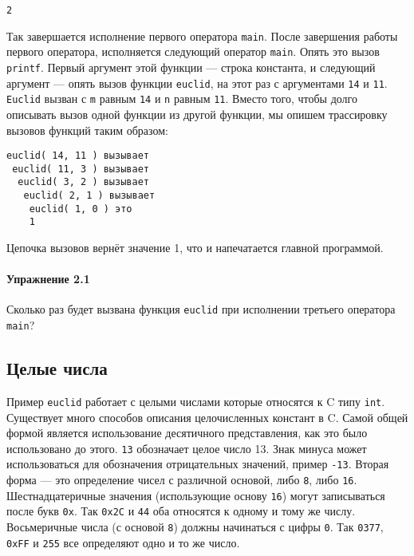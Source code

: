 \begin{lstlisting}
2
\end{lstlisting}

Так завершается исполнение первого оператора \lstinline|main|. После завершения работы первого оператора, исполняется следующий оператор \lstinline|main|. Опять это вызов \lstinline|printf|. Первый аргумент этой функции --- строка константа, и следующий аргумент --- опять вызов функции \lstinline|euclid|, на этот раз с аргументами \lstinline|14| и \lstinline|11|. \lstinline|Euclid| вызван с \lstinline|m| равным \lstinline|14| и \lstinline|n| равным \lstinline|11|. Вместо того, чтобы долго описывать вызов одной функции из другой функции, мы опишем трассировку вызовов функций таким образом:

\begin{lstlisting}
euclid( 14, 11 ) вызывает
 euclid( 11, 3 ) вызывает
  euclid( 3, 2 ) вызывает
   euclid( 2, 1 ) вызывает
    euclid( 1, 0 ) это
    1
\end{lstlisting}

Цепочка вызовов вернёт значение 1, что и напечатается главной программой.

\paragraph{Упражнение 2.1} Сколько раз будет вызвана функция \lstinline|euclid| при исполнении третьего оператора \lstinline|main|?

\subsection{Целые числа}\label{Integers}

Пример \lstinline|euclid| работает с целыми числами которые относятся к C типу \lstinline|int|. Существует много способов описания целочисленных констант в C. Самой общей формой является использование десятичного представления, как это было использовано до этого. \lstinline|13| обозначает целое число 13. Знак минуса может использоваться для обозначения отрицательных значений, пример \lstinline|-13|. Вторая форма --- это определение чисел с различной основой, либо \lstinline|8|, либо \lstinline|16|. Шестнадцатеричные значения (использующие основу \lstinline|16|) могут записываться после букв \lstinline|0x|. Так \lstinline|0x2C| и \lstinline|44| оба относятся к одному и тому же числу. Восьмеричные числа (с основой \lstinline|8|) должны начинаться с цифры \lstinline|0|. Так \lstinline|0377|, \lstinline|0xFF| и \lstinline|255| все определяют одно и то же число.


